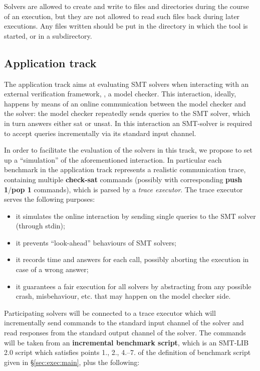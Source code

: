 \documentclass[12pt]{article}
\newcommand{\akey}[1]{\textbf{#1}}
\begin{document}
Solvers are allowed to create and write to
files and directories during the course of an execution, but they are
not allowed to read such files back during later executions.  Any
files written should be put in the directory in which the tool is
started, or in a subdirectory.

\subsection{Application track}
\label{sec:exec:application}

The application track aims at evaluating SMT solvers when interacting
with an external verification framework, \eg, a model
checker. This interaction, ideally, happens by means of an online
communication between the model checker and the solver: the model
checker repeatedly sends queries to the SMT solver, which in turn
answers either sat or unsat.  In this interaction an SMT-solver is
required to accept queries incrementally via its standard input channel.

In order to facilitate the evaluation of the solvers in this track, we
propose to set up a ``simulation'' of the aforementioned interaction. In
particular each benchmark in the application track represents a realistic
communication trace, containing multiple \akey{check-sat} commands (possibly
with corresponding \akey{push 1}/\akey{pop 1} commands), which
is parsed by a {\em trace executor}. The trace executor serves the following purposes:
\begin{itemize}
\item it simulates the online interaction by sending single queries to the SMT solver
      (through stdin);
\item it prevents ``look-ahead'' behaviours of SMT solvers;
\item it records time and answers for each call, possibly aborting the execution
      in case of a wrong answer;
\item it guarantees a fair execution for all solvers by abstracting from any possible
      crash, misbehaviour, etc. that may happen on the model checker side.
\end{itemize}

Participating solvers will be connected to a trace executor 
which will incrementally send commands to the standard input channel of the solver
and read responses from the standard output channel of the solver.
The commands will be taken from an \textbf{incremental benchmark script},
which is an SMT-LIB 2.0 script which satisfies points 1., 2., 4.--7. of the definition of benchmark script given in \S\ref{sec:exec:main}, plus the following:
\end{document}
